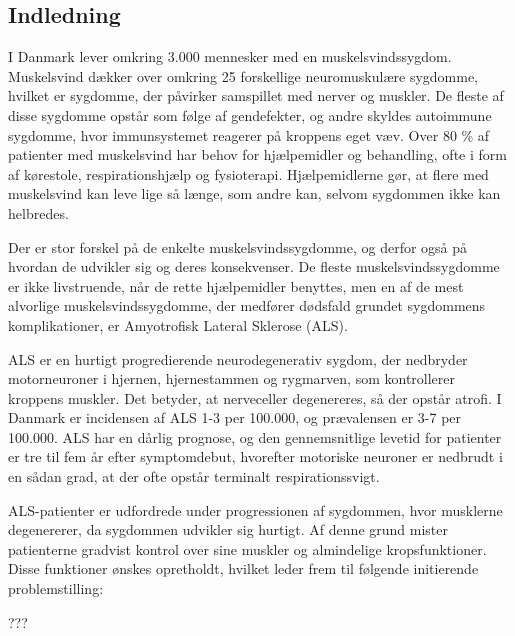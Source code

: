 \subsection{Indledning}


I Danmark lever omkring 3.000 mennesker med en muskelsvindssygdom. Muskelsvind dækker over omkring 25 forskellige neuromuskulære sygdomme, hvilket er sygdomme, der påvirker samspillet med nerver og muskler. De fleste af disse sygdomme opstår som følge af gendefekter, og andre skyldes autoimmune sygdomme, hvor immunsystemet reagerer på kroppens eget væv. Over 80 \% af patienter med muskelsvind har behov for hjælpemidler og behandling, ofte i form af kørestole, respirationshjælp og fysioterapi. Hjælpemidlerne gør, at flere med muskelsvind kan leve lige så længe, som andre kan, selvom sygdommen ikke kan helbredes. \citep{hvadermuskelsvind2016,sygdomsbeskrivelser2016}

Der er stor forskel på de enkelte muskelsvindssygdomme, og derfor også på hvordan de udvikler sig og deres konsekvenser. De fleste muskelsvindssygdomme er ikke livstruende, når de rette hjælpemidler benyttes, men en af de mest alvorlige muskelsvindssygdomme, der medfører dødsfald grundet sygdommens komplikationer, er Amyotrofisk Lateral Sklerose (ALS).  \citep{hvadermuskelsvind2016}

ALS er en hurtigt progredierende neurodegenerativ sygdom, der nedbryder motorneuroner i hjernen, hjernestammen og rygmarven, som kontrollerer kroppens muskler. Det betyder, at nerveceller degenereres, så der opstår atrofi. I Danmark er incidensen af ALS 1-3 per 100.000, og prævalensen er 3-7 per 100.000. ALS har en dårlig prognose, og den gennemsnitlige levetid for patienter er tre til fem år efter symptomdebut, hvorefter motoriske neuroner er nedbrudt i en sådan grad, at der ofte opstår terminalt respirationssvigt. \citep{russell2015, morris2015}

ALS-patienter er udfordrede under progressionen af sygdommen, hvor musklerne degenererer, da sygdommen udvikler sig hurtigt. Af denne grund mister patienterne gradvist kontrol over sine muskler og almindelige kropsfunktioner. Disse funktioner ønskes opretholdt, hvilket leder frem til følgende initierende problemstilling:

??? 
